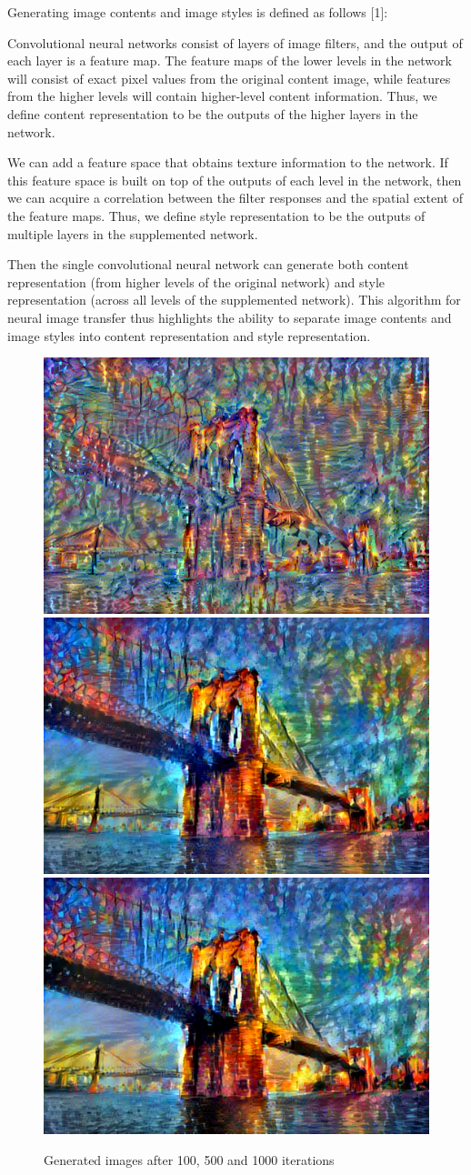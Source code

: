 \documentclass[10pt,twocolumn,letterpaper]{article}
\begin{document}
Generating image contents and image styles is defined as follows [1]:

Convolutional neural networks consist of layers of image filters, and the output of each layer is a feature map. The feature maps of the lower levels in the network will consist of exact pixel values from the original content image, while features from the higher levels will contain higher-level content information. Thus, we define content representation to be the outputs of the higher layers in the network.

We can add a feature space that obtains texture information to the network. If this feature space is built on top of the outputs of each level in the network, then we can acquire a correlation between the filter responses and the spatial extent of the feature maps. Thus, we define style representation to be the outputs of multiple layers in the supplemented network. 

Then the single convolutional neural network can generate both content representation (from higher levels of the original network) and style representation (across all levels of the supplemented network). This algorithm for neural image transfer thus highlights the ability to separate image contents and image styles into content representation and style representation. 

\begin{figure}
\begin{center}
\includegraphics[width=0.3\linewidth]{painted_bridge/out_100.png}
\includegraphics[width=0.3\linewidth]{painted_bridge/out_500.png}
\includegraphics[width=0.3\linewidth]{painted_bridge/out.png}
\end{center}
   \caption{Generated images after 100, 500 and 1000 iterations}
\label{fig:short}
\end{figure}
\end{document}
